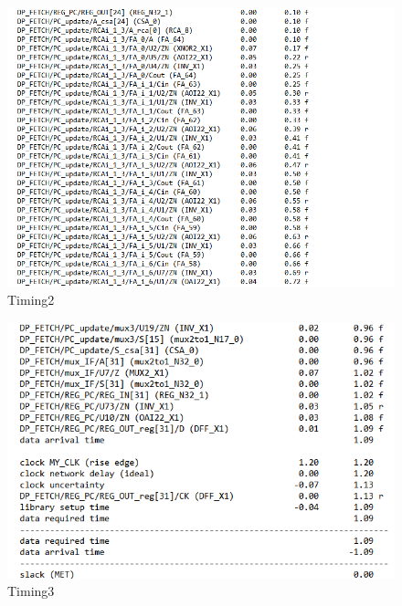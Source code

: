 \begin{figure}[h!]
	\centering
	\includegraphics[width=20cm]{./images/RISC_tim2}
	\caption{Timing2}
	\label{fig5.4}
\end{figure}
\begin{figure}[h!]
	\centering
	\includegraphics[width=18cm]{./images/RISC_tim3}
	\caption{Timing3}
	\label{fig5.5}
\end{figure}
